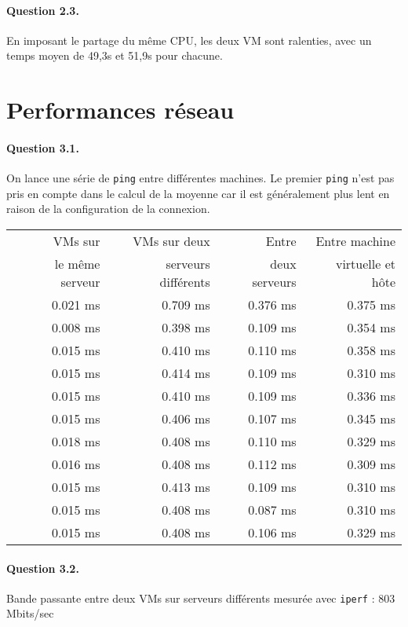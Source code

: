 \documentclass[a4paper]{article}
\begin{document}
\paragraph{Question 2.3.} En imposant le partage du même CPU, les deux VM sont ralenties, avec un temps moyen de 49,3s et 51,9s pour chacune.

\section{Performances réseau}
\paragraph{Question 3.1.} On lance une série de \texttt{ping} entre différentes machines. Le premier \texttt{ping} n'est pas pris en compte dans le calcul de la moyenne car il est généralement plus lent en raison de la configuration de la connexion.
\begin{center}
\begin{tabular}{r r r r}
VMs sur &
VMs sur deux &
Entre &
Entre machine \\
le même serveur &
serveurs différents &
deux serveurs &
virtuelle et hôte \\ \hline
0.021 ms & 0.709 ms & 0.376 ms & 0.375 ms \\
0.008 ms & 0.398 ms & 0.109 ms & 0.354 ms \\
0.015 ms & 0.410 ms & 0.110 ms & 0.358 ms \\
0.015 ms & 0.414 ms & 0.109 ms & 0.310 ms \\
0.015 ms & 0.410 ms & 0.109 ms & 0.336 ms \\
0.015 ms & 0.406 ms & 0.107 ms & 0.345 ms \\
0.018 ms & 0.408 ms & 0.110 ms & 0.329 ms \\
0.016 ms & 0.408 ms & 0.112 ms & 0.309 ms \\
0.015 ms & 0.413 ms & 0.109 ms & 0.310 ms \\
0.015 ms & 0.408 ms & 0.087 ms & 0.310 ms \\ \hline
0.015 ms & 0.408 ms & 0.106 ms & 0.329 ms
\end{tabular}
\end{center}

\paragraph{Question 3.2.}
Bande passante entre deux VMs sur serveurs différents mesurée avec \texttt{iperf} : 803 Mbits/sec
\end{document}
